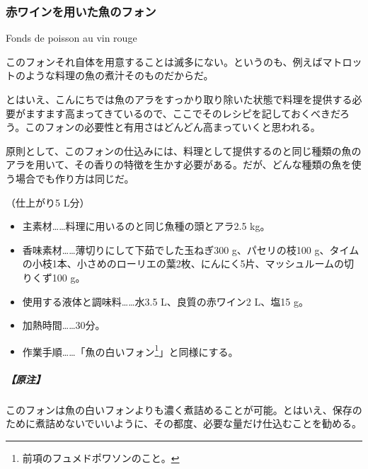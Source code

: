 \begin{recette}
{\subsubsection{赤ワインを用いた魚のフォン}\label{fonds-de-poisson-au-vin-rouge}}

\begin{frsubenv}

Fonds de poisson au vin rouge

\end{frsubenv}


このフォンそれ自体を用意することは滅多にない。というのも、例えばマトロットのような料理の魚の煮汁そのものだからだ。

とはいえ、こんにちでは魚のアラをすっかり取り除いた状態で料理を提供する必要がますます高まってきているので、ここでそのレシピを記しておくべきだろう。このフォンの必要性と有用さはどんどん高まっていくと思われる。

原則として、このフォンの仕込みには、料理として提供するのと同じ種類の魚のアラを用いて、その香りの特徴を生かす必要がある。だが、どんな種類の魚を使う場合でも作り方は同じだ。

（仕上がり5 L分）

\begin{itemize}
\item
  主素材\ldots{}\ldots{}料理に用いるのと同じ魚種の頭とアラ2.5 kg。
\item
  香味素材\ldots{}\ldots{}薄切りにして下茹でした玉ねぎ300
  g、パセリの枝100
  g、タイムの小枝1本、小さめのローリエの葉2枚、にんにく5片、マッシュルームの切りくず100
  g。
\item
  使用する液体と調味料\ldots{}\ldots{}水3.5 L、良質の赤ワイン2 L、塩15
  g。
\item
  加熱時間\ldots{}\ldots{}30分。
\item
  作業手順\ldots{}\ldots{}「魚の白いフォン\footnote{前項のフュメドポワソンのこと。}」と同様にする。
\end{itemize}

\hypertarget{nota-fonds-de-poisson-au-vin-rouge}{%
\subparagraph{【原注】}\label{nota-fonds-de-poisson-au-vin-rouge}}

このフォンは魚の白いフォンよりも濃く煮詰めることが可能。とはいえ、保存のために煮詰めないでいいように、その都度、必要な量だけ仕込むことを勧める。


\end{recette}
